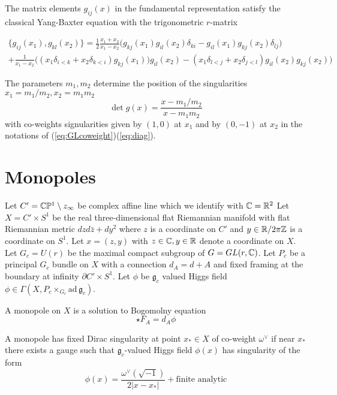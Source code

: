 \documentclass[12pt,psamsfonts,reqno]{amsart}
\begin{document}
The matrix elements $g_{ij}(x)$ in the fundamental representation satisfy the classical Yang-Baxter equation with the trigonometric $r$-matrix

\begin{multline}
  \{  g_{ij}(x_1), g_{kl}(x_2) \} = \frac{1}{2} \frac{ x_1 + x_2}{x_1 - x_2}
  \Big(  g_{kj}(x_1) g_{il}(x_2) \delta_{ki} - g_{il}(x_1) g_{kj}(x_2) \delta_{lj} \Big) \\
  + \frac{1}{x_1 -x_2} 
\Big ( (x_1 \delta_{i<k} + x_2 \delta_{k<i}) g_{kj}(x_1)) g_{il}(x_2)
 -(x_1 \delta_{l<j} + x_2 \delta_{j<l}) g_{il}(x_2) g_{kj}(x_2) \Big) 
\end{multline}

The parameters $m_1, m_2$ determine the position of the singularities $x_1 = m_1/m_2, x_2 = m_1 m_2$ 
\begin{equation}
  \det g(x) = \frac{ x- m_1/m_2}{x - m_1 m_2}
\end{equation}
with co-weights signularities given by $(1,0)$ at $x_1$ and by $(0,-1)$ at $x_2$ in the notations of (\ref{eq:GLcoweight})(\ref{eq:diag}). 




\section{Monopoles}


 Let $C' = \mathbb C \mathbb P^1 \setminus z_{\infty}$ be complex affine line which
  we identify with $\mathbb C = \mathbb R^2$
 Let $X  = C' \times S^1$
  be the real three-dimensional  flat Riemannian manifold  with flat Riemannian metric $ dz d \bar z + dy^2$ where $z$ is a coordinate
  on $C'$ and $y \in \mathbb R/ 2 \pi \mathbb Z$ is a coordinate on $S^1$. Let $x = (z, y)$ with $z \in \mathbb C, y \in \mathbb R$
  denote a coordinate on $X$. 
 Let $G_c = U(r)$ be the maximal compact subgroup
  of $G =GL(r, \mathbb C)$. Let $P_c$ be a principal $G_c$ bundle on $X$ with a connection $d_{A} = d + A$
  and fixed framing at the boundary at infinity $ \partial C' \times S^1$. 
  Let $\phi$ be $\mathfrak{g}_{c}$  valued Higgs field $\phi \in \Gamma(X, P_c \times_{G_c} \mathrm{ad}\, \mathfrak{g}_c)
$. 

\begin{definition}
A monopole on $X$ is a solution to Bogomolny equation
  \begin{equation}
    \star F_{A} = d_{A} \phi
  \end{equation}
\end{definition}


\begin{definition}
A monopole has fixed Dirac singularity at point $x_{*} \in X$ of co-weight $\omega^{\vee}$
  if near $x_*$ there exists a gauge such that $\mathfrak{g}_{c}$-valued Higgs field $\phi(x)$ has singularity
of the form
\begin{equation}
  \phi(x) = \frac{ \omega^{\vee} (\sqrt{-1})} { 2 |x - x_{*}|} + \text{finite analytic}
\end{equation}
\end{definition}
\end{document}

